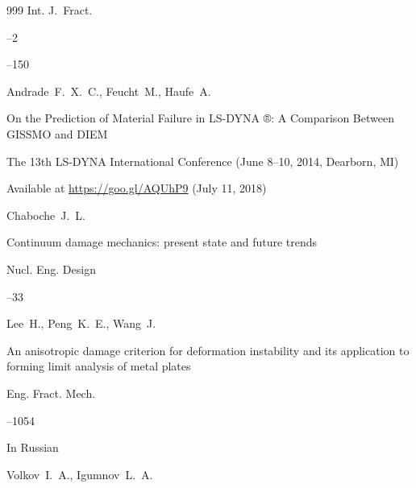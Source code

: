 \begin{thebibliography}{999}
\jour Int. J.~Fract.



--2

--150






\by Andrade~F.~X.~C., Feucht~M., Haufe~A.

\thesis On the Prediction of Material Failure in LS-DYNA ®: A Comparison Between GISSMO and DIEM

\thesisinfo The 13th LS-DYNA International Conference (June 8--10, 2014, Dearborn, MI)


\elink Available at \url{https://goo.gl/AQUhP9} (July 11, 2018)








\by Chaboche~J.~L. 

\paper Continuum damage mechanics: present state and future trends

\jour Nucl. Eng. Design




--33





\by Lee~H., Peng~K.~E., Wang~J.

\paper An anisotropic damage criterion for deformation instability and its application to forming limit analysis of metal plates

\jour Eng. Fract. Mech.




--1054





\lang In Russian

\by Volkov~I.~A., Igumnov~L.~A. 


\end{thebibliography}
